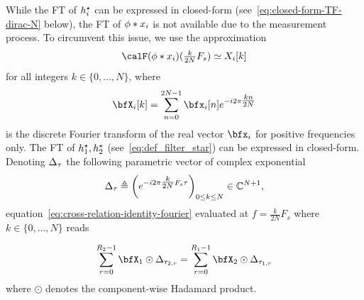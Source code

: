 While the FT of $h_i^\star$ can be expressed in closed-form (see~\eqref{eq:closed-form-TF-dirac-N} below), the FT of $\phi\ast x_i$ is not available due to the measurement process.
To circumvent this issue, we use the %
approximation
\begin{equation}
    \label{eq:approx-TF}
    \fourierTrans(\idealLowPassFilter\ast\contRecordedSignal_i)
    (\tfrac{k}{2N}F_s)
    \simeq
    X_i[k]
\end{equation}
for all integers  $k \in \{0, \ldots, N\}$,
where
\begin{equation}
    \label{eq:dft-Xi}
    \RecordedSignalDFT_i[k] = \sum_{n=0}^{2N-1}
    \bfx_i[n]
    \cste^{-\csti2\pi \tfrac{kn}{2N}} %
\end{equation}
is the discrete Fourier transform of the real vector $\bfx_i$ for positive frequencies only.
The FT of $h_1^\star,h_2^\star$ (see~\eqref{eq:def_filter_star}) can be expressed in closed-form.
Denoting $\Delta_{\tau}$ the following parametric vector of complex exponential
\begin{equation}
    \label{eq:closed-form-TF-dirac-N}
    \paramVec{\tau} \triangleq
    \left(\cste^{-\csti2\pi\tfrac{k}{2N}F_s \tau}\right)_{0 \leq k \leq N}
    \in\kC^{N+1}
    ,
\end{equation}
equation~\eqref{eq:cross-relation-identity-fourier} evaluated at $f = \frac{k}{2N}F_s$ where $k \in \{0,\ldots, N\}$
reads

\begin{equation}
    \label{eq:cross-relation-approx}
    \sum_{r=0}^{R_2-1}\bfX_1 \odot \paramVec{\tau_{2,r}}
    =
    \sum_{r=0}^{R_1-1}\bfX_2 \odot \paramVec{\tau_{1,r}}
\end{equation}
where $\odot$ denotes the component-wise Hadamard product.




